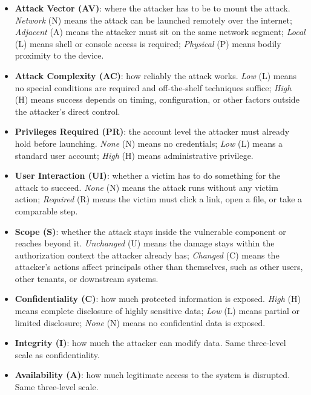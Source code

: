 \documentclass[12pt,a4paper]{report}
\begin{document}
\begin{itemize}[leftmargin=1.4em, itemsep=4pt]
  \item \textbf{Attack Vector (AV)}: where the attacker has to be to
        mount the attack. \emph{Network} (N) means the attack can be
        launched remotely over the internet; \emph{Adjacent} (A) means
        the attacker must sit on the same network segment; \emph{Local}
        (L) means shell or console access is required; \emph{Physical}
        (P) means bodily proximity to the device.
  \item \textbf{Attack Complexity (AC)}: how reliably the attack
        works. \emph{Low} (L) means no special conditions are required
        and off-the-shelf techniques suffice; \emph{High} (H) means
        success depends on timing, configuration, or other factors
        outside the attacker's direct control.
  \item \textbf{Privileges Required (PR)}: the account level the
        attacker must already hold before launching. \emph{None} (N)
        means no credentials; \emph{Low} (L) means a standard user
        account; \emph{High} (H) means administrative privilege.
  \item \textbf{User Interaction (UI)}: whether a victim has to do
        something for the attack to succeed. \emph{None} (N) means the
        attack runs without any victim action; \emph{Required} (R)
        means the victim must click a link, open a file, or take a
        comparable step.
  \item \textbf{Scope (S)}: whether the attack stays inside the
        vulnerable component or reaches beyond it. \emph{Unchanged}
        (U) means the damage stays within the authorization context
        the attacker already has; \emph{Changed} (C) means the
        attacker's actions affect principals other than themselves,
        such as other users, other tenants, or downstream systems.
  \item \textbf{Confidentiality (C)}: how much protected information
        is exposed. \emph{High} (H) means complete disclosure of
        highly sensitive data; \emph{Low} (L) means partial or
        limited disclosure; \emph{None} (N) means no confidential data
        is exposed.
  \item \textbf{Integrity (I)}: how much the attacker can modify
        data. Same three-level scale as confidentiality.
  \item \textbf{Availability (A)}: how much legitimate access to
        the system is disrupted. Same three-level scale.
\end{itemize}
\end{document}
